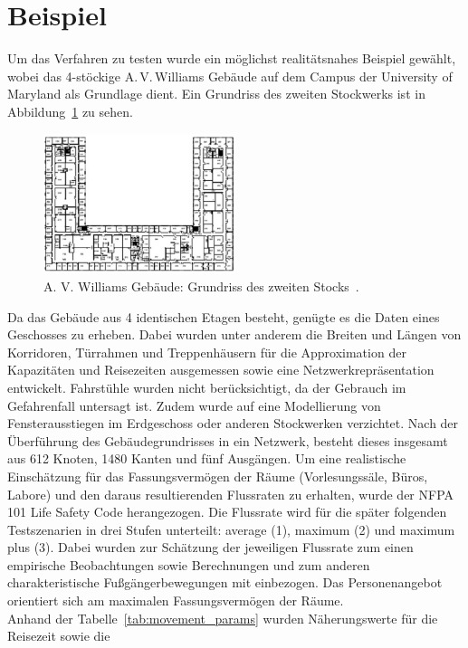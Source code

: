 \documentclass[a4paper, 11pt]{scrreprt}
\begin{document}
\section{Beispiel}
Um das Verfahren zu testen wurde ein möglichst realitätsnahes Beispiel gewählt, wobei das
4-stöckige A.\,V.\,Williams Gebäude auf dem Campus der University of Maryland als Grundlage dient.
Ein Grundriss des zweiten Stockwerks ist in Abbildung~\ref{fig:grundriss} zu sehen.
\begin{figure}[htb!]
    \centering
    \includegraphics[width=0.5\textwidth]{images/grundriss.png}
    \caption{A. V. Williams Gebäude: Grundriss des zweiten Stocks~\cite{bepsi}.}
    \label{fig:grundriss}
\end{figure}
Da das Gebäude aus 4 identischen Etagen besteht, genügte es die Daten eines Geschosses zu erheben.
Dabei wurden unter anderem die Breiten und Längen von Korridoren, Türrahmen und Treppenhäusern
für die Approximation der Kapazitäten und Reisezeiten
ausgemessen sowie eine Netzwerkrepräsentation entwickelt. Fahrstühle wurden nicht berücksichtigt, da
der Gebrauch im Gefahrenfall untersagt ist. Zudem wurde auf eine Modellierung von Fensterausstiegen im
Erdgeschoss oder anderen Stockwerken verzichtet.
Nach der Überführung des Gebäudegrundrisses in ein Netzwerk, besteht dieses insgesamt aus 612 Knoten,
1480 Kanten und fünf Ausgängen. Um eine realistische Einschätzung für das Fassungsvermögen der
Räume (Vorlesungssäle, Büros, Labore) und den daraus resultierenden Flussraten zu erhalten,
wurde der NFPA 101 Life Safety Code \cite{fassungsvermoegen} herangezogen.
Die Flussrate wird für die später folgenden Testszenarien in drei Stufen unterteilt:
average (1), maximum (2) und maximum plus (3). Dabei wurden zur Schätzung der jeweiligen
Flussrate zum einen empirische Beobachtungen sowie Berechnungen \cite{pedestrian} und zum anderen charakteristische
Fußgängerbewegungen \cite{movement_params} mit einbezogen. Das Personenangebot orientiert sich am maximalen
Fassungsvermögen der Räume.\\
Anhand der Tabelle~\ref{tab:movement_params} wurden Näherungswerte für die Reisezeit sowie die
\end{document}
